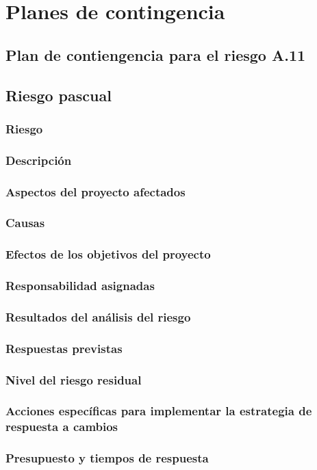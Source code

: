 \documentclass[11pt,a4paper,spanish,twoside]{book}
\begin{document}
\chapter{Planes de contingencia}
\section{Plan de contiengencia para el riesgo A.11}
\section{Riesgo pascual}
\subsection{Riesgo}
\subsection{Descripción}
\subsection{Aspectos del proyecto afectados}
\subsection{Causas}
\subsection{Efectos de los objetivos del proyecto}
\subsection{Responsabilidad asignadas}
\subsection{Resultados del análisis del riesgo}
\subsection{Respuestas previstas}
\subsection{Nivel del riesgo residual}
\subsection{Acciones específicas para implementar la estrategia de respuesta
a cambios}
\subsection{Presupuesto y tiempos de respuesta}
\end{document}
